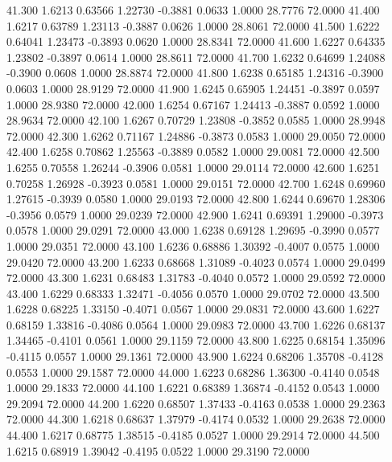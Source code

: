   41.300   1.6213   0.63566   1.22730  -0.3881   0.0633   1.0000  28.7776  72.0000
  41.400   1.6217   0.63789   1.23113  -0.3887   0.0626   1.0000  28.8061  72.0000
  41.500   1.6222   0.64041   1.23473  -0.3893   0.0620   1.0000  28.8341  72.0000
  41.600   1.6227   0.64335   1.23802  -0.3897   0.0614   1.0000  28.8611  72.0000
  41.700   1.6232   0.64699   1.24088  -0.3900   0.0608   1.0000  28.8874  72.0000
  41.800   1.6238   0.65185   1.24316  -0.3900   0.0603   1.0000  28.9129  72.0000
  41.900   1.6245   0.65905   1.24451  -0.3897   0.0597   1.0000  28.9380  72.0000
  42.000   1.6254   0.67167   1.24413  -0.3887   0.0592   1.0000  28.9634  72.0000
  42.100   1.6267   0.70729   1.23808  -0.3852   0.0585   1.0000  28.9948  72.0000
  42.300   1.6262   0.71167   1.24886  -0.3873   0.0583   1.0000  29.0050  72.0000
  42.400   1.6258   0.70862   1.25563  -0.3889   0.0582   1.0000  29.0081  72.0000
  42.500   1.6255   0.70558   1.26244  -0.3906   0.0581   1.0000  29.0114  72.0000
  42.600   1.6251   0.70258   1.26928  -0.3923   0.0581   1.0000  29.0151  72.0000
  42.700   1.6248   0.69960   1.27615  -0.3939   0.0580   1.0000  29.0193  72.0000
  42.800   1.6244   0.69670   1.28306  -0.3956   0.0579   1.0000  29.0239  72.0000
  42.900   1.6241   0.69391   1.29000  -0.3973   0.0578   1.0000  29.0291  72.0000
  43.000   1.6238   0.69128   1.29695  -0.3990   0.0577   1.0000  29.0351  72.0000
  43.100   1.6236   0.68886   1.30392  -0.4007   0.0575   1.0000  29.0420  72.0000
  43.200   1.6233   0.68668   1.31089  -0.4023   0.0574   1.0000  29.0499  72.0000
  43.300   1.6231   0.68483   1.31783  -0.4040   0.0572   1.0000  29.0592  72.0000
  43.400   1.6229   0.68333   1.32471  -0.4056   0.0570   1.0000  29.0702  72.0000
  43.500   1.6228   0.68225   1.33150  -0.4071   0.0567   1.0000  29.0831  72.0000
  43.600   1.6227   0.68159   1.33816  -0.4086   0.0564   1.0000  29.0983  72.0000
  43.700   1.6226   0.68137   1.34465  -0.4101   0.0561   1.0000  29.1159  72.0000
  43.800   1.6225   0.68154   1.35096  -0.4115   0.0557   1.0000  29.1361  72.0000
  43.900   1.6224   0.68206   1.35708  -0.4128   0.0553   1.0000  29.1587  72.0000
  44.000   1.6223   0.68286   1.36300  -0.4140   0.0548   1.0000  29.1833  72.0000
  44.100   1.6221   0.68389   1.36874  -0.4152   0.0543   1.0000  29.2094  72.0000
  44.200   1.6220   0.68507   1.37433  -0.4163   0.0538   1.0000  29.2363  72.0000
  44.300   1.6218   0.68637   1.37979  -0.4174   0.0532   1.0000  29.2638  72.0000
  44.400   1.6217   0.68775   1.38515  -0.4185   0.0527   1.0000  29.2914  72.0000
  44.500   1.6215   0.68919   1.39042  -0.4195   0.0522   1.0000  29.3190  72.0000
